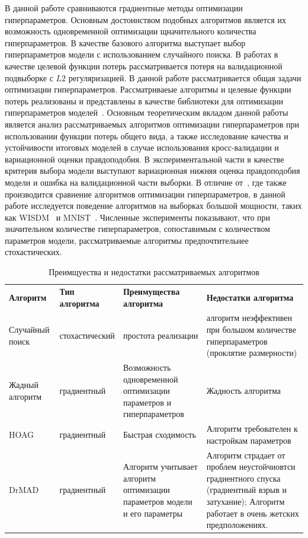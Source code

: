 \documentclass[12pt]{article}
\begin{document}
В данной работе сравниваются градиентные методы оптимизации гиперпараметров. Основным достоинством подобных алгоритмов является их возможность одновременной оптимизации щначительного количества гиперпараметров. В качестве базового алгоритма выступает выбор гиперпараметров модели с использованием случайного поиска.  В работах\cite{hyper_mad, hyper_hoag, hyper_greed} в качестве целевой функции потерь рассматривается потеря на валидационной подвыборке с $L2$ регуляризацией. В данной работе рассматривается общая задачи оптимизации гиперпараметров. Рассматриваеые алгоритмы и целевые функции потерь реализованы и представлены в качестве библиотеки для оптимизации гиперпараметров моделей~\cite{pyfos}. Основным теоретическим вкладом данной работы является анализ рассматриваемых алгоритмов оптимизации гиперпараметров при использовании функции потерь общего вида, а также исследование качества и устойчивости итоговых моделей в случае использования кросс-валидации и вариационной оценки правдоподобия.  В экспериментальной части в качестве критерия выбора модели выступают вариационная нижняя оценка правдоподобия модели и ошибка на валидационной части выборки. В отличие от~\cite{hyper_hoag}, где также производится сравнение алгоритмов оптимизации гиперпараметров, в данной работе исследуется поведение алгоритмов на выборках большой мощности, таких как WISDM~\cite{wisdm} и MNIST~\cite{mnist}.
Численные эксперименты показывают, что при значительном количестве гиперпараметров, сопоставимым с количеством параметров модели, рассматриваемые алгоритмы предпочтительнее стохастических. 


\begin{table}
\small

\begin{tabularx}{\textwidth}{|X|X|X|X|}
\hline
\bf Алгоритм & \bf Тип алгоритма & \bf Преимущества алгоритма & \bf Недостатки алгоритма  \\ 
Случайный поиск & стохастический & простота реализации& алгоритм неэффективен при большом количестве гиперпараметров (проклятие размерности)  \\ \hline
Жадный алгоритм~\cite{hyper_greed} & градиентный & Возможность одновременной оптимизации параметров и гиперпараметров & Жадность алгоритма \\ \hline
HOAG~\cite{hyper_hoag} & градиентный & Быстрая сходимость & Алгоритм требователен к настройкам параметров \\ \hline 
DrMAD~\cite{hyper_mad} & градиентный & Алгоритм учитывает алгоритм оптимизации параметров модели и его параметры & Алгоритм страдает от проблем неустойчиовтси градиентного спуска (градиентный взрыв и затухание); Алгоритм работает в очень жетских предположениях. \\ \hline
\end{tabularx}

\caption{Преимщуества и недостатки рассматриваемых алгоритмов}
\label{table:algo_descr}

\end{table}
\end{document}
